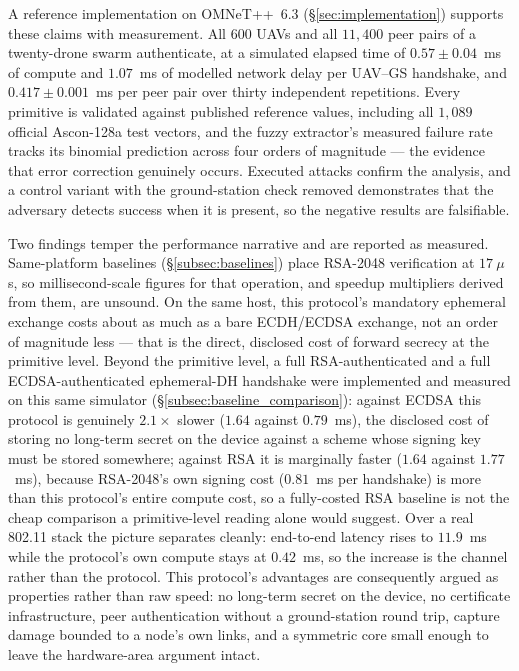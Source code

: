 \documentclass[11pt,a4paper]{article}
\begin{document}
A reference implementation on OMNeT++~6.3 (\S\ref{sec:implementation}) supports
these claims with measurement. All $600$ UAVs and all $11{,}400$ peer pairs of a
twenty-drone swarm authenticate, at a simulated elapsed time of
$0.57 \pm 0.04$~ms of compute and $1.07$~ms of modelled network delay per
UAV--GS handshake, and $0.417 \pm 0.001$~ms per peer pair over thirty independent
repetitions. Every
primitive is validated against published reference values, including all $1{,}089$
official Ascon-128a test vectors, and the fuzzy extractor's measured failure rate
tracks its binomial prediction across four orders of magnitude --- the evidence
that error correction genuinely occurs. Executed attacks
confirm the analysis, and a control variant with the ground-station check removed
demonstrates that the adversary detects success when it is present, so the negative
results are falsifiable.

Two findings temper the performance narrative and are reported as measured.
Same-platform baselines (\S\ref{subsec:baselines}) place RSA-2048 verification at
$17~\mu$s, so millisecond-scale figures for that operation, and speedup
multipliers derived from them, are unsound. On the same host, this protocol's
mandatory ephemeral exchange costs about as much as a bare ECDH/ECDSA
exchange, not an order of magnitude less --- that is the direct, disclosed
cost of forward secrecy at the primitive level. Beyond the primitive level, a
full RSA-authenticated and a full ECDSA-authenticated ephemeral-DH handshake
were implemented and measured on this same simulator
(\S\ref{subsec:baseline_comparison}): against ECDSA this protocol is genuinely
$2.1\times$ slower ($1.64$ against $0.79$~ms), the disclosed cost of storing no
long-term secret on the device against a scheme whose signing key must be
stored somewhere; against RSA it is marginally faster ($1.64$ against
$1.77$~ms), because RSA-2048's own signing cost ($0.81$~ms per handshake) is
more than this protocol's entire compute cost, so a fully-costed RSA baseline is
not the cheap comparison a primitive-level reading alone would suggest. Over a
real 802.11 stack the picture separates cleanly: end-to-end latency rises to
$11.9$~ms while the protocol's own compute stays at $0.42$~ms, so the increase is
the channel rather than the protocol. This protocol's advantages are consequently
argued as properties rather than raw speed: no long-term secret on the device, no
certificate infrastructure, peer authentication without a ground-station round
trip, capture damage bounded to a node's own links, and a symmetric core small
enough to leave the hardware-area argument intact.
\end{document}
